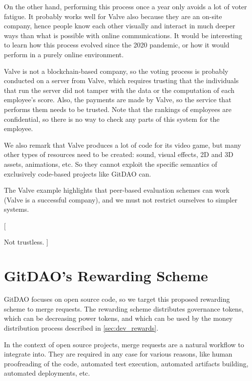 %
On the other hand, performing this process once a year only avoids a lot of voter fatigue.
It probably works well for Valve also because they are an on-site company, hence people know each other visually and interact in much deeper ways than what is possible with online communications.
It would be interesting to learn how this process evolved since the 2020 pandemic, or how it would perform in a purely online environment.

%
Valve is not a blockchain-based company, so the voting process is probably conducted on a server from Valve, which requires trusting that the individuals that run the server did not tamper with the data or the computation of each employee's score.
Also, the payments are made by Valve, so the service that performs them needs to be trusted.
Note that the rankings of employees are confidential, so there is no way to check any parts of this system for the employee.

We also remark that Valve produces a lot of code for its video game, but many other types of resources need to be created: sound, visual effects, 2D and 3D assets, animations, etc.
So they cannot exploit the specific semantics of exclusively code-based projects like GitDAO can.

The Valve example highlights that peer-based evaluation schemes can work (Valve is a successful company), and we must not restrict ourselves to simpler systems.

[%
  \item Not trustless.
]

\section{GitDAO's Rewarding Scheme}

GitDAO focuses on open source code, so we target this proposed rewarding scheme to merge requests.
The rewarding scheme distributes governance tokens, which can be decreasing power tokens, and which can be used by the money distribution process described in \cref{sec:dev_rewards}.

In the context of open source projects, merge requests are a natural workflow to integrate into.
They are required in any case for various reasons, like human proofreading of the code, automated test execution, automated artifacts building, automated deployments, etc.

